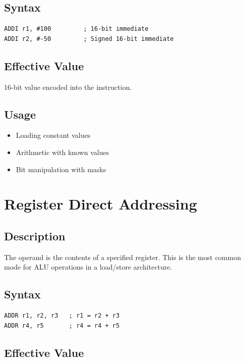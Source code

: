 \subsection{Syntax}

\begin{lstlisting}
ADDI r1, #100         ; 16-bit immediate
ADDI r2, #-50         ; Signed 16-bit immediate
\end{lstlisting}

\subsection{Effective Value}

16-bit value encoded into the instruction.

\subsection{Usage}

\begin{itemize}
	\item Loading constant values
	\item Arithmetic with known values
	\item Bit manipulation with masks
\end{itemize}

\section{Register Direct Addressing}

\subsection{Description}

The operand is the contents of a specified register. This is the most common mode for ALU operations in a load/store
architecture.

\subsection{Syntax}

\begin{lstlisting}
ADDR r1, r2, r3   ; r1 = r2 + r3
ADDR r4, r5       ; r4 = r4 + r5
\end{lstlisting}

\subsection{Effective Value}

